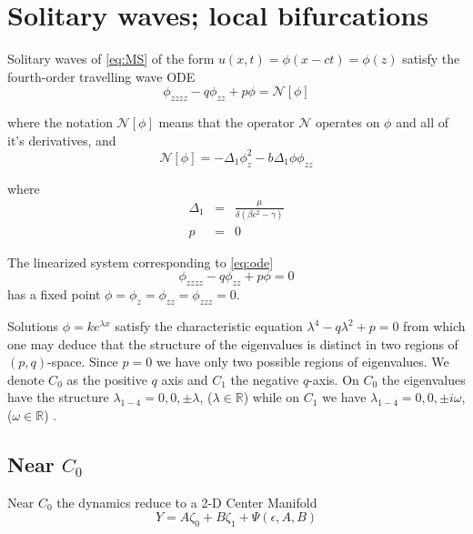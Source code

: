 \section{Solitary waves; local bifurcations}

Solitary waves of \eqref{eq:MS} of the form 
$u(x,t) = \phi\left(x - c t\right) = \phi\left(z\right)$
 satisfy the fourth-order travelling wave ODE
\begin{equation} \label{eq:ode} \phi_{zzzz} - q \phi_{zz} + p \phi = \mathcal{N}[\phi]
\end{equation}

where the notation $\mathcal{N[\phi]}$ means that the operator $\mathcal{N}$ operates on $\phi$ and all of it's derivatives, and 
\begin{equation}
\mathcal{N}\left[\phi\right] = -\Delta_1 \phi_z^2 - b \Delta_1 \phi \phi_{zz}
\end{equation}

where 
\begin{subequations}
\begin{eqnarray}
\Delta_1 &=& \frac{\mu}{ \delta\left( \beta c^2 - \gamma\right) } \\
p &=& 0 
\end{eqnarray}
\end{subequations}

The linearized system corresponding to \eqref{eq:ode}
\begin{equation}
 \label{eq:linode} \phi_{zzzz} - q \phi_{zz} + p \phi = 0
\end{equation}
has a fixed point $\phi = \phi_z = \phi_{zz} = \phi_{zzz} = 0 $.

Solutions $\phi = k e^{\lambda x}$ satisfy the characteristic equation
$\lambda^4 - q \lambda^2 + p = 0 $ from which one may deduce that the structure
of the eigenvalues is distinct in two regions of $\left(p,q\right)$-space.
Since $p=0$ we have only two possible regions of eigenvalues.  We denote $C_0$
as the positive $q$ axis and $C_1$ the negative $q$-axis.  On $C_0$ the
eigenvalues have the structure $\lambda_{1-4} = 0,0,\pm \lambda$, ($\lambda \in
\mathbb{R}$) while on $C_1$ we have $\lambda_{1-4} = 0,0,\pm i \omega $,
($\omega \in \mathbb{R} $) .


\subsection{ Near $C_0$ }
Near $C_0$ the dynamics reduce to a 2-D Center Manifold
\begin{equation} Y = A \zeta_0 + B \zeta_1 + \Psi(\epsilon,A,B)
\end{equation}

